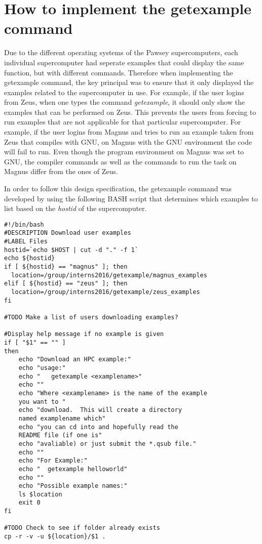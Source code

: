 \section{How to implement the getexample command}

Due to the different operating systems of the Pawsey supercomputers, each individual supercomputer had seperate examples that could display the same
function, but with different commands. Therefore when implementing the getexample command, the key principal was to ensure that it only displayed the
examples related to the supercomputer in use. For example, if the user logins from Zeus, when one types the command \emph{getexample}, it should only
show the examples that can be performed on Zeus. This prevents the users from forcing to run examples that are not applicable for that particular 
supercomputer. For example, if the user logins from Magnus and tries to run an example taken from Zeus that compiles with GNU, on Magnus with the GNU 
environment the code will fail to run. Even though the program environment on Magnus was set to GNU, the compiler commands as well as the commands to
run the task on Magnus differ from the ones of Zeus.

In order to follow this design specification, the getexample command was developed by using the following BASH script that determines which examples to
list based on the \emph{hostid} of the supercomputer.    


\begin{tcolorbox}
\begin{Verbatim}[fontsize=\scriptsize]
#!/bin/bash
#DESCRIPTION Download user examples
#LABEL Files
hostid=`echo $HOST | cut -d "." -f 1`
echo ${hostid}
if [ ${hostid} == "magnus" ]; then 
  location=/group/interns2016/getexample/magnus_examples
elif [ ${hostid} == "zeus" ]; then
  location=/group/interns2016/getexample/zeus_examples
fi

#TODO Make a list of users downloading examples?

#Display help message if no example is given
if [ "$1" == "" ]
then
    echo "Download an HPC example:"
    echo "usage:"
    echo "   getexample <examplename>"
    echo ""
    echo "Where <examplename> is the name of the example 
    you want to "
    echo "download.  This will create a directory 
    named examplename which"
    echo "you can cd into and hopefully read the 
    README file (if one is"
    echo "avaliable) or just submit the *.qsub file."
    echo ""
    echo "For Example:"
    echo "  getexample helloworld"
    echo ""
    echo "Possible example names:"
    ls $location 
    exit 0
fi

#TODO Check to see if folder already exists
cp -r -v -u ${location}/$1 .
\end{Verbatim}
\end{tcolorbox}

